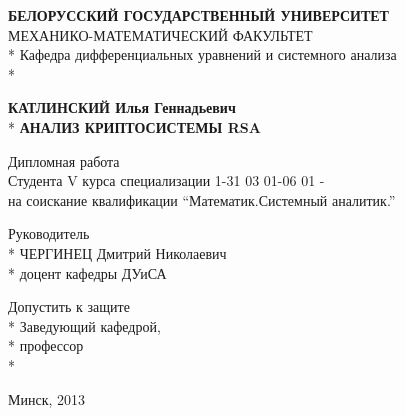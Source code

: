 \begin{titlepage}
	\newpage

	\begin{center}

		\textbf{БЕЛОРУССКИЙ ГОСУДАРСТВЕННЫЙ УНИВЕРСИТЕТ} \\
		\vspace{0.5cm}		
		МЕХАНИКО-МАТЕМАТИЧЕСКИЙ ФАКУЛЬТЕТ \\*
		Кафедра дифференциальных уравнений и системного анализа \\*

	\end{center}

	\vspace{5em}

	\begin{center}
		\textbf{КАТЛИНСКИЙ Илья Геннадьевич} \\*
		\vspace{0.5cm}
		\textbf{АНАЛИЗ КРИПТОСИСТЕМЫ RSA}
	\end{center}

	\vspace{2.5em}
	 
	\begin{center}
		Дипломная работа \\ Студента V курса специализации 1-31 03 01-06 01 - \\
		на соискание квалификации “Математик.Системный аналитик.”
	\end{center}

	\vspace{6em}
	 
	\begin{flushright}
		Руководитель \\*	
		ЧЕРГИНЕЦ Дмитрий Николаевич \\*
		доцент кафедры ДУиСА		
	\end{flushright}

	\begin{flushleft}
		Допустить к защите \\*
		Заведующий кафедрой, \\*
		профессор \\*		
	\end{flushleft}
	 
	\vspace{\fill}

	\begin{center}
		Минск, 2013
	\end{center}

\end{titlepage}